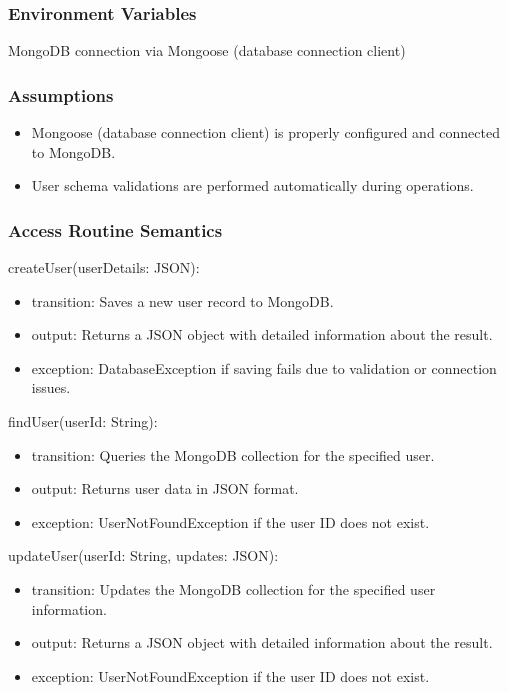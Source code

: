 \documentclass[12pt, titlepage]{article}
\begin{document}
\subsubsection{Environment Variables}
MongoDB connection via Mongoose (database connection client)

\subsubsection{Assumptions}
\begin{itemize}
  \item Mongoose (database connection client) is properly configured and connected to MongoDB.
  \item User schema validations are performed automatically during operations.
\end{itemize}

\subsubsection{Access Routine Semantics}

\noindent createUser(userDetails: JSON):
\begin{itemize}
  \item transition: Saves a new user record to MongoDB.
  \item output: Returns a JSON object with detailed information about the result.
  \item exception: DatabaseException if saving fails due to validation or connection issues.
\end{itemize}

\noindent findUser(userId: String):
\begin{itemize}
  \item transition: Queries the MongoDB collection for the specified user.
  \item output: Returns user data in JSON format.
  \item exception: UserNotFoundException if the user ID does not exist.
\end{itemize}

\noindent updateUser(userId: String, updates: JSON):
\begin{itemize}
  \item transition: Updates the MongoDB collection for the specified user information.
  \item output: Returns a JSON object with detailed information about the result.
  \item exception: UserNotFoundException if the user ID does not exist.
\end{itemize}
\end{document}
